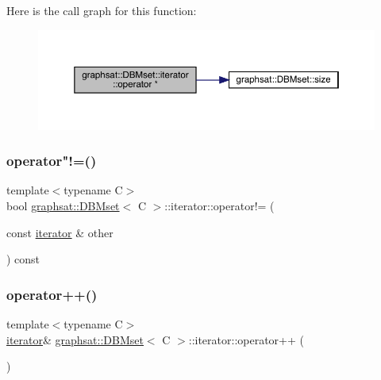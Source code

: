 Here is the call graph for this function\+:
\nopagebreak
\begin{figure}[H]
\begin{center}
\leavevmode
\includegraphics[width=350pt]{classgraphsat_1_1_d_b_mset_1_1iterator_ad825adc5a116f2637e87325db768d113_cgraph}
\end{center}
\end{figure}
\mbox{\label{classgraphsat_1_1_d_b_mset_1_1iterator_a29c0e3f6f9b744414c51a5cff2033a5b}} 
\subsubsection{\texorpdfstring{operator"!=()}{operator!=()}}
{\footnotesize\ttfamily template$<$typename C$>$ \\
bool \mbox{\hyperlink{classgraphsat_1_1_d_b_mset}{graphsat\+::\+D\+B\+Mset}}$<$ C $>$\+::iterator\+::operator!= (\begin{DoxyParamCaption}\item[{const \mbox{\hyperlink{classgraphsat_1_1_d_b_mset_1_1iterator}{iterator}} \&}]{other }\end{DoxyParamCaption}) const\hspace{0.3cm}{\ttfamily [inline]}}

\mbox{\label{classgraphsat_1_1_d_b_mset_1_1iterator_a8e2e0cdd973480db0f2f7b98b1ce649c}} 
\subsubsection{\texorpdfstring{operator++()}{operator++()}}
{\footnotesize\ttfamily template$<$typename C$>$ \\
\mbox{\hyperlink{classgraphsat_1_1_d_b_mset_1_1iterator}{iterator}}\& \mbox{\hyperlink{classgraphsat_1_1_d_b_mset}{graphsat\+::\+D\+B\+Mset}}$<$ C $>$\+::iterator\+::operator++ (\begin{DoxyParamCaption}{ }\end{DoxyParamCaption})\hspace{0.3cm}{\ttfamily [inline]}}

